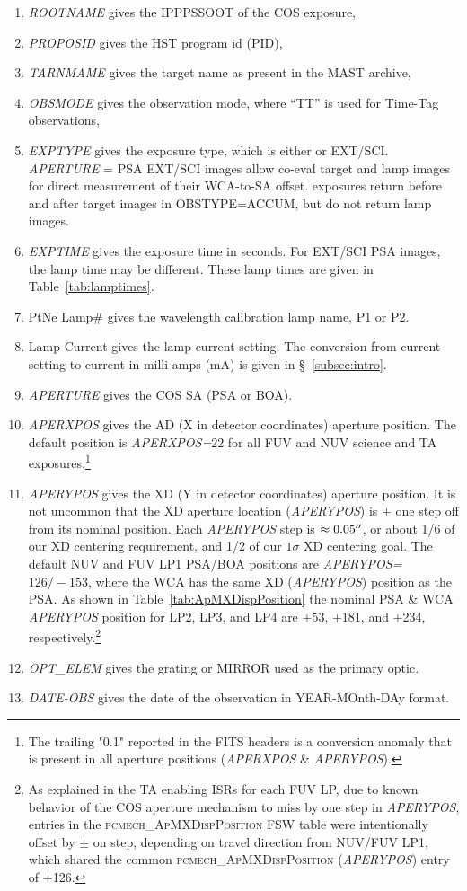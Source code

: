 \begin{enumerate}
\item \textit{ROOTNAME} gives the IPPPSSOOT of the COS exposure,
\item \textit{PROPOSID} gives the HST program id (PID),
\item \textit{TARNMAME} gives the target name as present in the MAST archive,
\item \textit{OBSMODE} gives the observation mode, where ``TT'' is used for Time-Tag observations,
\item \textit{EXPTYPE} gives the exposure type, which is either  or EXT/SCI. \textit{APERTURE} = PSA EXT/SCI images allow co-eval target and lamp images for
direct measurement of their WCA-to-SA offset.  exposures return before and after target images in \textsc{OBSTYPE}=ACCUM, but do not return lamp images.
\item \textit{EXPTIME} gives the exposure time in seconds. For EXT/SCI PSA images, the lamp time may be different. These lamp times are given in Table~\ref{tab:lamptimes}.
\item PtNe Lamp\# gives the wavelength calibration lamp name, P1 or P2.
\item Lamp Current gives the lamp current setting. The conversion from current setting to current in milli-amps (mA) is given in \S~\ref{subsec:intro}.
\item \textit{APERTURE} gives the COS SA (PSA or BOA).
\item \textit{APERXPOS} gives the AD (X in detector coordinates) aperture position. The default position is \textit{APERXPOS=$22$} for all FUV and NUV science and TA exposures.\footnote{The trailing "0.1" reported in the FITS headers is a conversion anomaly that is present in all aperture positions (\textit{APERXPOS} \& \textit{APERYPOS}).}
\item \textit{APERYPOS} gives the XD (Y in detector coordinates) aperture position. It is not uncommon that the XD aperture location (\textit{APERYPOS}) is $\pm$ one step off from its nominal position. Each \textit{APERYPOS} step is $\approx0.05\hbox{$^{\prime\prime}$}$, or about 1/6 of
our XD centering requirement, and 1/2 of our $1\sigma$ XD centering goal. The default NUV and FUV LP1 PSA/BOA positions are \textit{APERYPOS=$126/-153$}, where the WCA has the same XD (\textit{APERYPOS}) position as the PSA.
As shown in Table~\ref{tab:ApMXDispPosition} the nominal PSA \& WCA \textit{APERYPOS} position for LP2, LP3, and LP4 are +53, +181, and +234, respectively.\footnote{As explained in the TA enabling ISRs for each FUV LP, due
to known behavior of the COS aperture mechanism to miss by one step in \textit{APERYPOS}, entries in the \textsc{pcmech\_ApMXDispPosition} FSW table were intentionally offset by $\pm$ on step, depending on travel direction from NUV/FUV LP1, which
shared the common \textsc{pcmech\_ApMXDispPosition} (\textit{APERYPOS}) entry of +126.}
\item \textit{OPT\_ELEM} gives the grating or MIRROR used as the primary optic.
\item \textit{DATE-OBS} gives the date of the observation in YEAR-MOnth-DAy format.
\end{enumerate}
\normalsize

